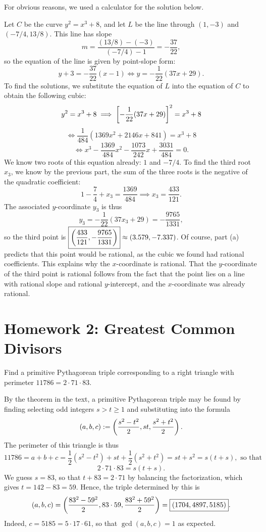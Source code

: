 \documentclass{article}
\begin{document}
\begin{exercise}
For obvious reasons, we used a calculator for the solution below.
\begin{solution}
Let $C$ be the curve $y^2=x^3+8$, and let $L$ be the line through $(1,-3)$ and $(-7/4, 13/8)$. This line has slope
$$m = \frac{(13/8) - (-3)}{(-7/4)-1} = -\frac{37}{22},$$
so the equation of the line is given by point-slope form:
$$y +3 = -\frac{37}{22}(x-1) \iff y = -\frac 1{22}(37x + 29).$$
To find the solutions, we substitute the equation of $L$ into the equation of $C$ to obtain the following cubic:
$$y^2 = x^3+8 \implies \left[-\frac 1{22}(37x+29)\right]^2 = x^3+8$$
$$\iff \frac 1{484}(1369x^2+2146x+841) = x^3+8$$
$$\iff x^3 - \frac{1369}{484}x^2 -\frac{1073}{242}x + \frac{3031}{484} = 0.$$
We know two roots of this equation already: $1$ and $-7/4$. To find the third root $x_3$, we know by the previous part, the sum of the three roots is the negative of the quadratic coefficient:
$$1 - \frac74 + x_3 = \frac{1369}{484} \implies x_3 = \frac{433}{121}.$$
The associated $y$-coordinate $y_3$ is thus
$$y_3 = -\frac 1{22}(37x_3+29) = -\frac{9765}{1331},$$
so the third point is $\boxed{\left(\frac{433}{121}, -\frac{9765}{1331} \right)} \approx (3.579, -7.337)$. Of course, part (a) predicts that this point would be rational, as the cubic we found had rational coefficients. This explains why the $x$-coordinate is rational. That the $y$-coordinate of the third point is rational follows from the fact that the point lies on a line with rational slope and rational $y$-intercept, and the $x$-coordinate was already rational.
\end{solution}
\end{exercise}

\section*{Homework 2: Greatest Common Divisors}
\begin{exercise}
Find a primitive Pythagorean triple corresponding to a right triangle with perimeter $11786 = 2\cdot 71 \cdot 83$.
\end{exercise}
\begin{solution}
By the theorem in the text, a primitive Pythagorean triple may be found by finding selecting odd integers $s > t \geq 1$ and substituting into the formula \newpage
$$(a,b,c) := \left(\frac{s^2-t^2}2, st,\frac{s^2+t^2}2 \right).$$
The perimeter of this triangle is thus
$$11786 = a+b+c = \frac 12(s^2-t^2)+st + \frac 12(s^2 + t^2) = st+s^2 = s(t+s), \text{ so that}$$
$$2\cdot 71 \cdot 83 = s(t+s).$$
We guess $s = 83$, so that $t + 83 = 2\cdot 71$ by balancing the factorization, which gives $t = 142 - 83 = 59$. Hence, the triple determined by this is
$$(a,b,c) = \left(\frac{83^2-59^2}2, 83\cdot 59, \frac{83^2+59^2}2 \right) = \boxed{\left(1704, 4897, 5185 \right)}.$$
Indeed, $c = 5185 = 5\cdot 17\cdot 61$, so that $\gcd(a,b,c) = 1$ as expected.
\end{solution}
\end{document}
